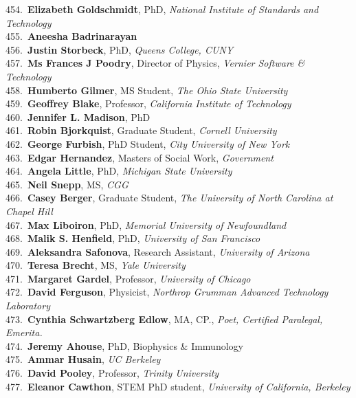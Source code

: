 454.~{\bf Elizabeth Goldschmidt}, PhD, {\sl National Institute of Standards and Technology} \\
455.~{\bf Aneesha Badrinarayan} \\
456.~{\bf Justin Storbeck}, PhD, {\sl Queens College, CUNY} \\
457.~{\bf Ms Frances J Poodry}, Director of Physics, {\sl Vernier Software \& Technology} \\
458.~{\bf Humberto Gilmer}, MS Student, {\sl The Ohio State University} \\
459.~{\bf Geoffrey Blake}, Professor, {\sl California Institute of Technology} \\
460.~{\bf Jennifer L. Madison}, PhD \\
461.~{\bf Robin Bjorkquist}, Graduate Student, {\sl Cornell University} \\
462.~{\bf George Furbish}, PhD Student, {\sl City University of New York} \\
463.~{\bf Edgar Hernandez}, Masters of Social Work, {\sl Government} \\
464.~{\bf Angela Little}, PhD, {\sl Michigan State University} \\
465.~{\bf Neil Snepp}, MS, {\sl CGG} \\
466.~{\bf Casey Berger}, Graduate Student, {\sl The University of North Carolina at Chapel Hill} \\
467.~{\bf Max Liboiron}, PhD, {\sl Memorial University of Newfoundland } \\
468.~{\bf Malik S. Henfield}, PhD, {\sl University of San Francisco} \\
469.~{\bf Aleksandra Safonova}, Research Assistant, {\sl University of Arizona} \\
470.~{\bf Teresa Brecht}, MS, {\sl Yale University } \\
471.~{\bf Margaret Gardel}, Professor, {\sl University of Chicago} \\
472.~{\bf David Ferguson}, Physicist, {\sl Northrop Grumman Advanced Technology Laboratory} \\
473.~{\bf Cynthia Schwartzberg Edlow}, MA, CP., {\sl Poet, Certified Paralegal, Emerita.} \\
474.~{\bf Jeremy Ahouse}, PhD, Biophysics \& Immunology \\
475.~{\bf Ammar Husain}, {\sl UC Berkeley} \\
476.~{\bf David Pooley}, Professor, {\sl Trinity University} \\
477.~{\bf Eleanor Cawthon}, STEM PhD student, {\sl University of California, Berkeley} \\
